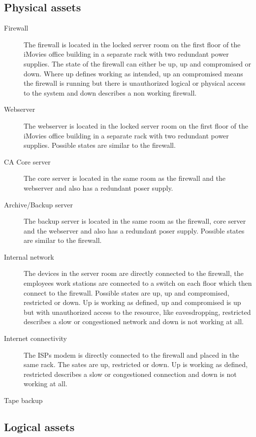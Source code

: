 \documentclass[a4paper, toc=index, 12pt, DIV14, twoside, BCOR2cm, headsepline, numbers=noenddot, bibliography=totoc]{scrbook}
\begin{document}
\subsection{Physical assets}
\begin{description}
\item[Firewall ] The firewall is located in the locked server room on the first floor of the iMovies office building in a separate rack with two redundant power supplies. The state of the firewall can either be up, up and compromised or down. Where up defines working as intended, up an compromised means the firewall is running but there is unauthorized logical or physical access to the system and down describes a non working firewall.
\item[Webserver ] The webserver is located in the locked server room on the first floor of the iMovies office building in a separate rack with two redundant power supplies. Possible states are similar to the firewall.
\item[CA Core server ] The core server is located in the same room as the firewall and the webserver and also has a redundant poser supply. 
\item[Archive/Backup server ] The backup server is located in the same room as the firewall, core server and the webserver and also has a redundant poser supply. Possible states are similar to the firewall.
\item[Internal network ] The devices in the server room are directly connected to the firewall, the employees work stations are connected to a switch on each floor which then connect to the firewall. Possible states are up, up and compromised, restricted or down. Up is working as defined, up and compromised is up but with unauthorized access to the resource, like eavesdropping, restricted describes a slow or congestioned network and down is not working at all.
\item[Internet connectivity ] The ISPs modem is directly connected to the firewall and placed in the same rack. The sates are up, restricted or down. Up is working as defined, restricted describes a slow or congestioned connection and down is not working at all.
\item[Tape backup ] 
\end{description}


\subsection{Logical assets}
\end{document}
